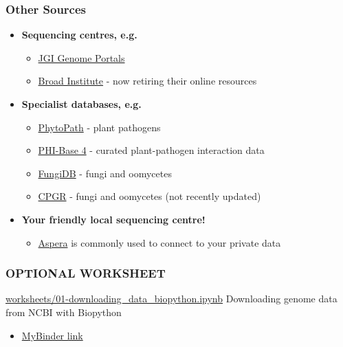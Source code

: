 \begin{frame}
  \frametitle{Other Sources}
    \begin{itemize}
      \item \textcolor{hutton_green}{\textbf{Sequencing centres, e.g.}}
      \begin{itemize}
        \item \textcolor{hutton_purple}{\href{http://genome.jgi.doe.gov/}{JGI Genome Portals}}
        \item \textcolor{hutton_purple}{\href{https://www.broadinstitute.org/}{Broad Institute}} - now retiring their online resources
      \end{itemize}
      \item \textcolor{hutton_blue}{\textbf{Specialist databases, e.g.}}
      \begin{itemize}
        \item \textcolor{hutton_purple}{\href{http://www.phytopathdb.org/}{PhytoPath}} - plant pathogens
        \item \textcolor{hutton_purple}{\href{http://www-phi4.phibase.org/}{PHI-Base 4}} - curated plant-pathogen interaction data
        \item \textcolor{hutton_purple}{\href{http://fungidb.org/fungidb/}{FungiDB}} - fungi and oomycetes
        \item \textcolor{hutton_purple}{\href{http://cpgr.plantbiology.msu.edu/}{CPGR}} - fungi and oomycetes (not recently updated)
      \end{itemize}
      \item \textcolor{RawSienna}{\textbf{Your friendly local sequencing centre!}}
      \begin{itemize}
        \item \textcolor{hutton_purple}{\href{http://asperasoft.com/}{Aspera}} is commonly used to connect to your private data
      \end{itemize}
    \end{itemize}
\end{frame}

\begin{frame}
  \frametitle{OPTIONAL WORKSHEET}
  \begin{alertblock}{\url{worksheets/01-downloading_data_biopython.ipynb}}
    Downloading genome data from NCBI with Biopython
  \end{alertblock}
  \begin{itemize}
    \item \textcolor{hutton_purple}{\href{http://mybinder.org/repo/widdowquinn/Teaching-EMBL-Plant-Path-Genomics}{MyBinder link}}
  \end{itemize}
\end{frame}